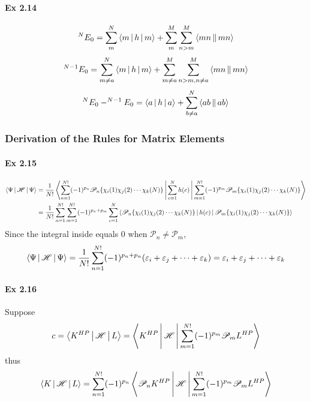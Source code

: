 \documentclass[a4paper]{article}
\newcommand{\ex}[1]{\paragraph{Ex #1}}
\numberwithin{equation}{subsection}
\begin{document}
\ex{2.14}
\begin{equation}\label{key}
^N E_0 = \sum_m^N \Braket{m|h|m} + \sum_m^M\sum_{n>m}^M \Braket{mn||mn}
\end{equation}
\begin{equation}\label{key}
^{N-1}E_0 = \sum_{m\neq a}^N \Braket{m|h|m} + \sum_{m\neq a}^M\sum_{n>m, n\neq a}^M \Braket{mn||mn}
\end{equation}
\begin{equation}\label{key}
^N E_0 - ^{N-1}E_0 = \Braket{a|h|a} + \sum_{b\neq a}^N \Braket{ab||ab}
\end{equation}

\subsubsection{Derivation of the Rules for Matrix Elements}
\ex{2.15}
\begin{equation}\label{key}
\begin{aligned}
\Braket{\Psi | \mathscr{H} | \Psi} &= \dfrac{1}{N!} \Braket{\sum_{n=1}^{N!} (-1)^{p_n}\mathscr{P}_n\{\chi_i(1)\chi_j(2)\cdots\chi_k(N)\} | \sum_{c=1}^N h(c) | \sum_{m=1}^{N!} (-1)^{p_m}\mathscr{P}_m\{\chi_i(1)\chi_j(2)\cdots\chi_k(N)\}}\\
&= \dfrac{1}{N!} \sum_{n=1}^{N!} \sum_{m=1}^{N!} (-1)^{p_n + p_m} \sum_{c=1}^N \Braket{ \mathscr{P}_n \{\chi_i(1)\chi_j(2)\cdots\chi_k(N)\} |  h(c) | \mathscr{P}_m \{ \chi_i(1)\chi_j(2)\cdots\chi_k(N)\}}\\
\end{aligned}
\end{equation}
Since the integral inside equals $ 0 $ when $ \mathscr{P}_n \neq \mathscr{P}_m $,
\begin{equation}\label{key}
\Braket{\Psi | \mathscr{H} | \Psi} = \dfrac{1}{N!} \sum_{n=1}^{N!} (-1)^{p_n + p_n} (\varepsilon_i+\varepsilon_j+\cdots+\varepsilon_k) = \varepsilon_i+\varepsilon_j+\cdots+\varepsilon_k
\end{equation}

\ex{2.16}
Suppose
\begin{equation}\label{key}
c = \Braket{K^{HP} | \mathscr{H} | L} = \Braket{K^{HP} | \mathscr{H} | \sum_{m=1}^{N!}(-1)^{p_m}\mathscr{P}_m L^{HP}}
\end{equation}
thus
\begin{equation}\label{key}
\Braket{K | \mathscr{H} | L} = \sum_{n=1}^{N!} (-1)^{p_n} \Braket{\mathscr{P}_n K^{HP} | \mathscr{H} | \sum_{m=1}^{N!}(-1)^{p_m}\mathscr{P}_m L^{HP}}
\end{equation}
\end{document}
